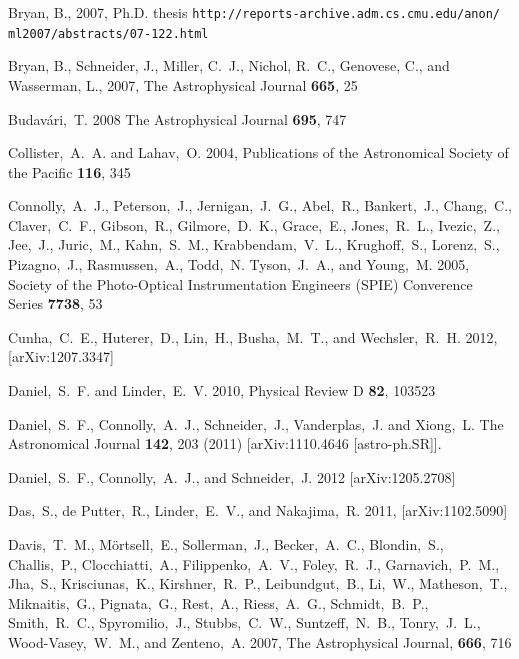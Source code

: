 \documentclass[useAMS,usenatbib,tightenlines,11pt,preprint]{aastex}
\begin{document}
\begin{thebibliography}{99}
Bryan, B., 2007, Ph.D. thesis
\verb|http://reports-archive.adm.cs.cmu.edu/anon/|
\verb|ml2007/abstracts/07-122.html|

Bryan, B., Schneider, J., Miller, C.~J., Nichol, R.~C., Genovese, C., and
Wasserman, L., 2007,
The Astrophysical Journal {\bf 665}, 25

Budav\'ari,~T. 2008 The Astrophysical Journal {\bf 695}, 747

Collister,~A.~A. and Lahav,~O. 2004,
Publications of the Astronomical Society of the Pacific {\bf 116}, 345

Connolly,~A.~J., Peterson,~J., Jernigan,~J.~G., Abel,~R., Bankert,~J.,
Chang,~C., Claver,~C.~F., Gibson,~R., Gilmore,~D.~K., Grace,~E., Jones,~R.~L.,
Ivezic,~Z., Jee,~J., Juric,~M., Kahn,~S.~M., Krabbendam,~V.~L., Krughoff,~S.,
Lorenz,~S., Pizagno,~J., Rasmussen,~A., Todd,~N. Tyson,~J.~A., and Young,~M.
2005, Society of the Photo-Optical Instrumentation Engineers (SPIE) Converence
Series {\bf 7738}, 53

Cunha,~C.~E., Huterer,~D., Lin,~H., Busha,~M.~T., and Wechsler,~R.~H. 2012,
[arXiv:1207.3347]

Daniel,~S.~F. and Linder,~E.~V. 2010, Physical Review D {\bf 82}, 103523

  Daniel,~S.~F., Connolly,~A.~J., Schneider,~J., Vanderplas,~J. and Xiong,~L. 
  The Astronomical Journal  {\bf 142}, 203 (2011)
  [arXiv:1110.4646 [astro-ph.SR]].

Daniel,~S.~F., Connolly,~A.~J., and Schneider,~J. 2012
[arXiv:1205.2708]

Das,~S., de Putter,~R., Linder,~E.~V., and Nakajima,~R. 2011,
[arXiv:1102.5090]

Davis,~T.~M., M\"ortsell,~E., Sollerman,~J., Becker,~A.~C., Blondin,~S.,
Challis,~P., Clocchiatti,~A., Filippenko,~A.~V., Foley,~R.~J., Garnavich,~P.~M.,
Jha,~S., Krisciunas,~K., Kirshner,~R.~P., Leibundgut,~B., Li,~W., Matheson,~T.,
Miknaitis,~G., Pignata,~G., Rest,~A., Riess,~A.~G., Schmidt,~B.~P.,
Smith,~R.~C., Spyromilio,~J., Stubbs,~C.~W., Suntzeff,~N.~B., Tonry,~J.~L.,
Wood-Vasey,~W.~M., and Zenteno,~A. 2007, The Astrophysical Journal, {\bf 666},
716


\end{thebibliography}
\end{document}
